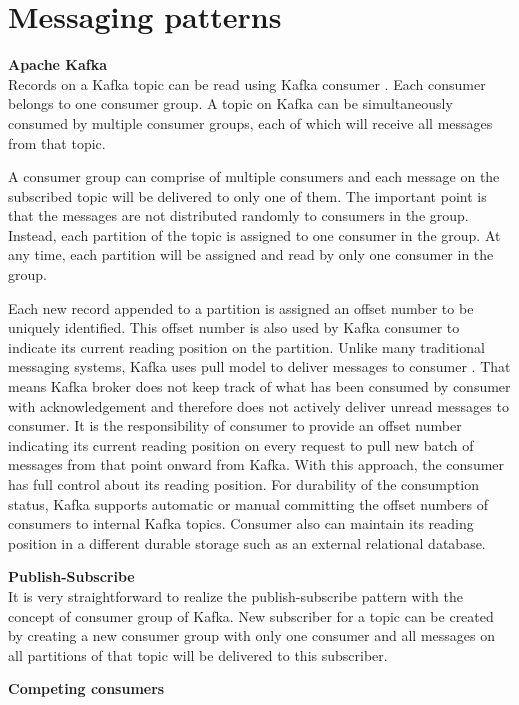 \section{Messaging patterns}
\large \textbf{Apache Kafka}\\
\normalsize
Records on a Kafka topic can be read using Kafka consumer \cite{kafkaconsumer}.  Each consumer belongs to one consumer group. A topic on Kafka can be simultaneously consumed by multiple consumer groups, each of which will receive all messages from that topic. 
 
A consumer group can comprise of multiple consumers and each message on the subscribed topic will be delivered to only one of them. The important point is that the messages are not distributed randomly to consumers in the group. Instead, each partition of the topic is assigned to one consumer in the group. At any time, each partition will be assigned and read by only one consumer in the group. 

Each new record appended to a partition is assigned an offset number to be uniquely identified. This offset number is also used by Kafka consumer to indicate its current reading position on the partition. Unlike many traditional messaging systems, Kafka uses pull model to deliver messages to consumer \cite{kafkaconsumer}. That means Kafka broker does not keep track of what has been consumed by consumer with acknowledgement and therefore does not actively deliver unread messages to consumer.  It is the responsibility of consumer to provide an offset number indicating its current reading position on every request to pull new batch of messages from that point onward from Kafka. With this approach, the consumer has full control about its reading position. For durability of the consumption status, Kafka supports automatic or manual committing the offset numbers of consumers to internal Kafka topics. Consumer also can maintain its reading position in a different durable storage such as an external relational database.

\textbf{Publish-Subscribe}\\
It is very straightforward to realize the publish-subscribe pattern with the concept of consumer group of Kafka. New subscriber for a topic can be created by creating a new consumer group with only one consumer and all messages on all partitions of that topic will be delivered to this subscriber.

\textbf{Competing consumers}\\

